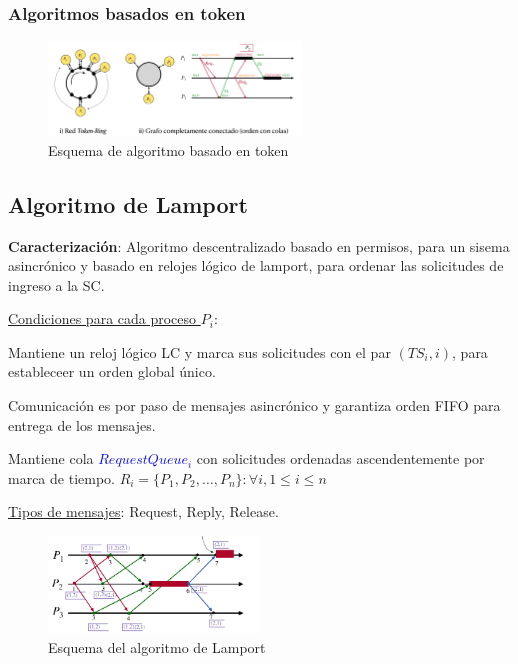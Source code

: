 \subsubsection{Algoritmos basados en token}

\begin{figure}[H]
    \centering
    \includegraphics[width=0.6\textwidth]{img/Algoritmos_token.png}
    \caption{Esquema de algoritmo basado en token}
\end{figure}

\subsection{Algoritmo de Lamport} 

\textbf{Caracterización}: Algoritmo descentralizado basado en permisos, para un sisema asincrónico y basado en relojes lógico de lamport, para ordenar las solicitudes de ingreso a la SC.

\vspace{0.5em}
\underline{Condiciones para cada proceso $P_i$}: 

Mantiene un reloj lógico LC y marca sus solicitudes con el par $(TS_i, i)$, para estableceer un orden global único. 

Comunicación es por paso de mensajes asincrónico y garantiza orden FIFO para entrega de los mensajes. 

Mantiene cola \textcolor{blue}{$RequestQueue_i$} con solicitudes ordenadas ascendentemente por marca de tiempo. $R_i = \{P_1, P_2, \ldots, P_n\} : \forall i, 1 \leq i \leq n$

\vspace{0.5em}

\underline{Tipos de mensajes}: Request, Reply, Release.

\begin{figure}[H]
    \centering
    \includegraphics[width=0.5\textwidth]{img/A_Lamport.png}
    \caption{Esquema del algoritmo de Lamport}
\end{figure}

